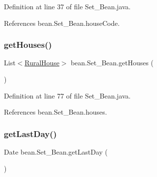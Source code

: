 Definition at line 37 of file Set\+\_\+\+Bean.\+java.


\begin{DoxyCode}{0}

\end{DoxyCode}


References bean.\+Set\+\_\+\+Bean.\+house\+Code.

\mbox{\label{classbean_1_1Set__Bean_adb0d58588e1704cbc2eeb74ead53175c}} 
\subsubsection{\texorpdfstring{getHouses()}{getHouses()}}
{\footnotesize\ttfamily List$<$\mbox{\hyperlink{classdomain_1_1RuralHouse}{Rural\+House}}$>$ bean.\+Set\+\_\+\+Bean.\+get\+Houses (\begin{DoxyParamCaption}{ }\end{DoxyParamCaption})}



Definition at line 77 of file Set\+\_\+\+Bean.\+java.


\begin{DoxyCode}{0}

\end{DoxyCode}


References bean.\+Set\+\_\+\+Bean.\+houses.

\mbox{\label{classbean_1_1Set__Bean_ad9e455b4a923d74204c2d8d3ea4d99cb}} 
\subsubsection{\texorpdfstring{getLastDay()}{getLastDay()}}
{\footnotesize\ttfamily Date bean.\+Set\+\_\+\+Bean.\+get\+Last\+Day (\begin{DoxyParamCaption}{ }\end{DoxyParamCaption})}



